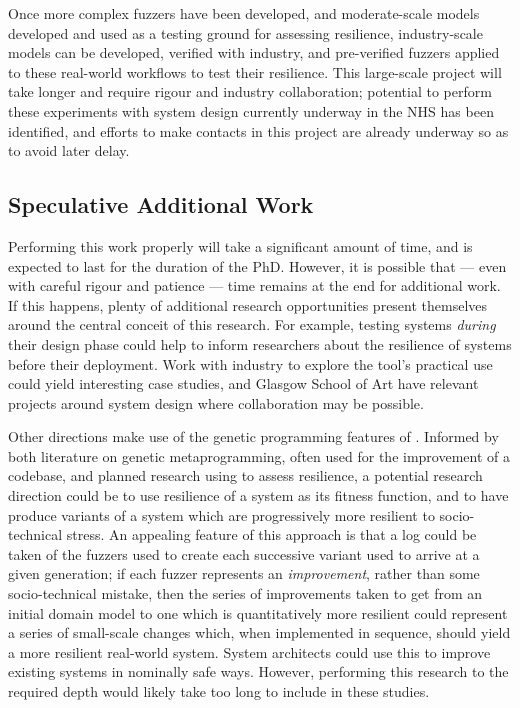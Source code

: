 \documentclass[draft]{article}
\begin{document}
Once more complex fuzzers have been developed, and moderate-scale models
developed and used as a testing ground for assessing resilience, industry-scale
models can be developed, verified with industry, and pre-verified fuzzers
applied to these real-world workflows to test their resilience. This large-scale
project will take longer and require rigour and industry collaboration;
potential to perform these experiments with system design currently underway in
the NHS has been identified, and efforts to make contacts in this project are
already underway so as to avoid later delay.\par


\subsection{Speculative Additional Work}
Performing this work properly will take a significant amount of time, and is
expected to last for the duration of the PhD. However, it is possible that ---
even with careful rigour and patience --- time remains at the end for additional
work. If this happens, plenty of additional research opportunities present
themselves around the central conceit of this research. For example, testing
systems \emph{during} their design phase could help to inform researchers about
the resilience of systems before their deployment. Work with industry to explore
the tool's practical use could yield interesting case studies, and Glasgow
School of Art have relevant projects around system design where collaboration
may be possible.\par


Other directions make use of the genetic programming features of \pdsf{}.
Informed by both literature on genetic metaprogramming, often used for the
improvement of a codebase, and planned research using \pdsf{} to assess
resilience, a potential research direction could be to use resilience of a
system as its fitness function, and to have \pdsf{} produce variants of a
system which are progressively more resilient to socio-technical stress. An
appealing feature of this approach is that a log could be taken of the fuzzers
used to create each successive variant used to arrive at a given generation; if
each fuzzer represents an \emph{improvement}, rather than some socio-technical
mistake, then the series of improvements taken to get from an initial domain
model to one which is quantitatively more resilient could represent a series of
small-scale changes which, when implemented in sequence, should yield a more
resilient real-world system. System architects could use this to improve
existing systems in nominally safe ways. However, performing this research to
the required depth would likely take too long to include in these studies.\par
\end{document}
